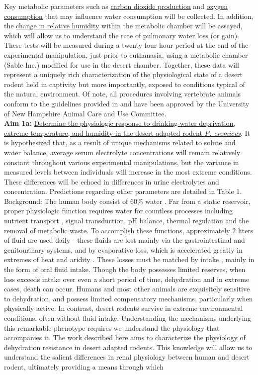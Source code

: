\documentclass[12pt]{article}
\begin{document}
Key metabolic parameters such as \ul{carbon dioxide production} and \ul{oxygen consumption} that may influence water consumption will be collected. In addition, the \ul{change in relative humidity} within the metabolic chamber will be assayed, which will allow us to understand the rate of pulmonary water loss (or gain). These tests will be measured during a twenty four hour period at the end of the experimental manipulation, just prior to euthanasia, using a metabolic chamber (Sable Inc.) modified for use in the desert chamber. Together, these data will represent a uniquely rich characterization of the physiological state of a desert rodent held in captivity but more importantly, exposed to conditions typical of the natural environment. Of note, all procedures involving vertebrate animals conform to the guidelines provided in \citep{Sikes:2011dz} and have been approved by the University of New Hampshire Animal Care and Use Committee. \\

\noindent \textbf{Aim 1a:} \ul{Determine the physiologic response to drinking-water deprivation, extreme temperature, and humidity in the desert-adapted rodent \textit{P. eremicus}}. It is hypothesized that, as a result of unique mechanisms related to solute and water balance, average serum electrolyte concentrations will remain relatively constant throughout various experimental manipulations, but the variance in measured levels between individuals will increase in the most extreme conditions. These differences will be echoed in differences in urine electrolytes and concentration. Predictions regarding other parameters are detailed in Table 1. \\


Background: The human body consist of 60\% water \citep{Jequier:2009cz}. Far from a static reservoir, proper physiologic function requires water for countless processes including nutrient transport \citep{Haussinger:1996wl}, signal transduction, pH balance, thermal regulation \citep{Montain:1999ux} and the removal of metabolic waste. To accomplish these functions, approximately 2 liters of fluid are used daily - these fluids are lost mainly via the gastrointestinal and genitourinary systems, and by evaporative loss, which is accelerated greatly in extremes of heat and aridity \citep{Cheuvront:2010eg}. These losses must be matched by intake \citep{Jequier:2009cz}, mainly in the form of oral fluid intake. Though the body possesses limited reserves, when loss exceeds intake over even a short period of time, dehydration and in extreme cases, death can occur. Humans and most other animals are exquisitely sensitive to dehydration, and possess limited compensatory mechanisms, particularly when physically active. In contrast, desert rodents survive in extreme environmental conditions, often without fluid intake. Understanding the mechanisms underlying this remarkable phenotype requires we understand the physiology that accompanies it. The work described here aims to characterize the physiology of dehydration resistance in desert adapted rodents. This knowledge will allow us to understand the salient differences in renal physiology between human and desert rodent, ultimately providing a means through which    \\
\end{document}
